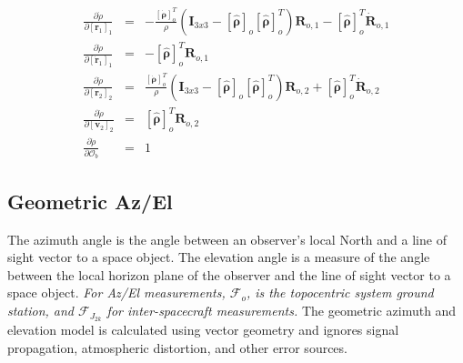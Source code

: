 \begin{eqnarray}
    \frac{\partial \dot{\rho}}{\partial \left[ \mathbf{r}_1 \right]_{1}} & = & -\frac{ \left[ \dot{\boldsymbol{\rho}} \right]_o^T }{\rho} \left( \mathbf{I}_{3x3} -
       \left[ \hat{\boldsymbol{\rho}}\right]_o  \left[ \hat{\boldsymbol{\rho}}\right]_o^T \right)\mathbf{R}_{o,1} -  \left[ \hat{\boldsymbol{\rho}}\right]_o^T \dot{\mathbf{R}}_{o,1} \\
    \frac{\partial \dot{\rho}}{\partial \left[ \dot{\mathbf{r}}_1 \right]_{1}} & = &  - \left[ \hat{\boldsymbol{\rho}}\right]_o^T \mathbf{R}_{o,1}\\
    \frac{\partial \dot{\rho}}{\partial \left[ \mathbf{r}_2 \right]_{2}} & = & \frac{ \left[ \dot{\boldsymbol{\rho}} \right]_o^T }{\rho} \left( \mathbf{I}_{3x3} -
       \left[ \hat{\boldsymbol{\rho}}\right]_o  \left[ \hat{\boldsymbol{\rho}}\right]_o^T \right) \mathbf{R}_{o,2} +  \left[ \hat{\boldsymbol{\rho}}\right]_o^T \dot{\mathbf{R}}_{o,2}\\
    \frac{\partial \dot{\rho}}{\partial \left[ \mathbf{v}_2 \right]_{2}} & = &  \left[ \hat{\boldsymbol{\rho}}\right]_o^T \mathbf{R}_{o,2}\\
    \frac{\partial \dot{\rho}}{\partial  \mathcal{O}_b } & = & 1
\end{eqnarray}

\subsection{Geometric Az/El}

The azimuth angle is the angle between an observer's local North and
a line of sight vector to a space object. The elevation angle is a
measure of the angle between the local horizon plane of the observer
and the line of sight vector to a space object.   \textit{For Az/El
measurements, $\mathcal{F}_o$, is the topocentric system ground
station, and $\mathcal{F}_{J_{2k}}$ for
inter-spacecraft measurements.} The geometric azimuth and elevation
model is calculated using vector geometry and ignores signal
propagation, atmospheric distortion, and other error sources.

